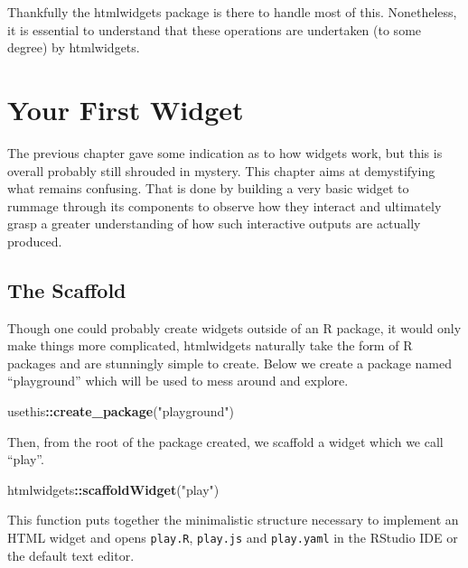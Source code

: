 \documentclass[
  10pt,
]{krantz}
\makeatletter
\newenvironment{Shaded}{\begin{snugshade}}{\end{snugshade}}
\newcommand{\KeywordTok}[1]{\textcolor[rgb]{0.27,0.27,0.27}{\textbf{#1}}}
\newcommand{\NormalTok}[1]{#1}
\newcommand{\OperatorTok}[1]{\textcolor[rgb]{0.43,0.43,0.43}{\textbf{#1}}}
\newcommand{\StringTok}[1]{\textcolor[rgb]{0.5,0.5,0.5}{#1}}
\newenvironment{kframe}{%
\medskip{}
\setlength{\fboxsep}{.8em}
 \def\at@end@of@kframe{}%
 \ifinner\ifhmode%
  \def\at@end@of@kframe{\end{minipage}}%
  \begin{minipage}{\columnwidth}%
 \fi\fi%
 \def\FrameCommand##1{\hskip\@totalleftmargin \hskip-\fboxsep
 \colorbox{shadecolor}{##1}\hskip-\fboxsep
     \hskip-\linewidth \hskip-\@totalleftmargin \hskip\columnwidth}%
 \MakeFramed {\advance\hsize-\width
   \@totalleftmargin\z@ \linewidth\hsize
   \@setminipage}}%
 {\par\unskip\endMakeFramed%
 \at@end@of@kframe}
\renewenvironment{Shaded}{\begin{kframe}}{\end{kframe}}
\makeatother
\begin{document}
Thankfully the htmlwidgets package is there to handle most of this. Nonetheless, it is essential to understand that these operations are undertaken (to some degree) by htmlwidgets.

\hypertarget{widgets-first}{%
\chapter{Your First Widget}\label{widgets-first}}

The previous chapter gave some indication as to how widgets work, but this is overall probably still shrouded in mystery. This chapter aims at demystifying what remains confusing. That is done by building a very basic widget to rummage through its components to observe how they interact and ultimately grasp a greater understanding of how such interactive outputs are actually produced.

\hypertarget{widgets-first-scaffold}{%
\section{The Scaffold}\label{widgets-first-scaffold}}

Though one could probably create widgets outside of an R package, it would only make things more complicated, htmlwidgets naturally take the form of R packages and are stunningly simple to create. Below we create a package named ``playground'' which will be used to mess around and explore.

\begin{Shaded}
\begin{Highlighting}[]
\NormalTok{usethis}\OperatorTok{::}\KeywordTok{create\_package}\NormalTok{(}\StringTok{"playground"}\NormalTok{)}
\end{Highlighting}
\end{Shaded}

Then, from the root of the package created, we scaffold a widget which we call ``play''.

\begin{Shaded}
\begin{Highlighting}[]
\NormalTok{htmlwidgets}\OperatorTok{::}\KeywordTok{scaffoldWidget}\NormalTok{(}\StringTok{"play"}\NormalTok{)}
\end{Highlighting}
\end{Shaded}

This function puts together the minimalistic structure necessary to implement an HTML widget and opens \texttt{play.R}, \texttt{play.js} and \texttt{play.yaml} in the RStudio IDE or the default text editor.
\end{document}

